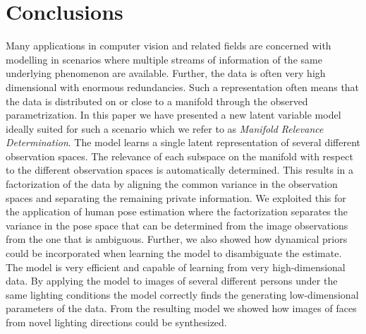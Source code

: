 \section{Conclusions \label{conclusions}}
Many applications in computer vision and related fields are concerned
with modelling in scenarios where multiple streams of information of
the same underlying phenomenon are available. Further, the data is
often very high dimensional with
enormous redundancies. Such a representation often means that the data
is distributed on or close to a manifold through the observed
parametrization.  In this paper we have presented a new latent
variable model ideally suited for such a scenario which we refer to as
\emph{Manifold Relevance Determination}. The model learns a single
latent representation of several different observation spaces. The
relevance of each subspace on the manifold with respect to the
different observation spaces is automatically determined. This results
in a factorization of the data by aligning the common variance in the
observation spaces and separating the remaining private information.
We exploited this for the application of human pose estimation where
the factorization separates the variance in the pose space that can be
determined from the image observations from the one that is
ambiguous. Further, we also showed how dynamical priors could be
incorporated when learning the model to disambiguate the
estimate. The model is very efficient and capable of learning
from very high-dimensional data. By applying the model to images of
several different persons under the same lighting conditions the model
correctly finds the generating low-dimensional parameters of the
data. From the resulting model we showed how images of faces from
novel lighting directions could be synthesized.
